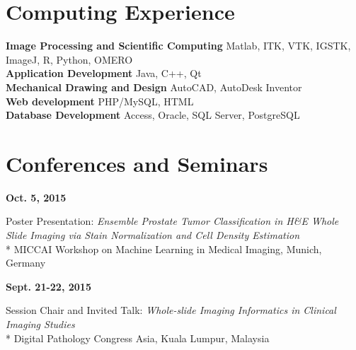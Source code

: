 \documentclass[line,a4paper]{resume}
\begin{document}
\begin{resume}
    \section{\mysidestyle Computing Experience}\vspace{2mm}

    \textbf{Image Processing and Scientific Computing} Matlab, ITK, VTK, IGSTK, ImageJ, R, Python, OMERO \\
    \textbf{Application Development} Java, C++, Qt \\
    \textbf{Mechanical Drawing and Design} AutoCAD, AutoDesk Inventor \\
    \textbf{Web development} PHP/MySQL, HTML \\
    \textbf{Database Development} Access, Oracle, SQL Server, PostgreSQL \\
	

\section{\mysidestyle Conferences and Seminars}\vspace{2mm}
\noindent
\begin{minipage}[t]{0.20\linewidth}
\textbf{Oct. 5, 2015}
\end{minipage}
\begin{minipage}[t]{0.80\linewidth}\raggedright
Poster Presentation: \emph{Ensemble Prostate Tumor Classification in H\&E Whole Slide Imaging via Stain Normalization and Cell Density Estimation} \\*
MICCAI Workshop on Machine Learning in Medical Imaging, Munich, Germany
\end{minipage}

\noindent
\begin{minipage}[t]{0.20\linewidth}
\textbf{Sept. 21-22, 2015}
\end{minipage}
\begin{minipage}[t]{0.80\linewidth}\raggedright
Session Chair and Invited Talk: \emph{Whole-slide Imaging Informatics in Clinical Imaging Studies}\\*
Digital Pathology Congress Asia, Kuala Lumpur, Malaysia
\end{minipage}


\end{resume}
\end{document}

